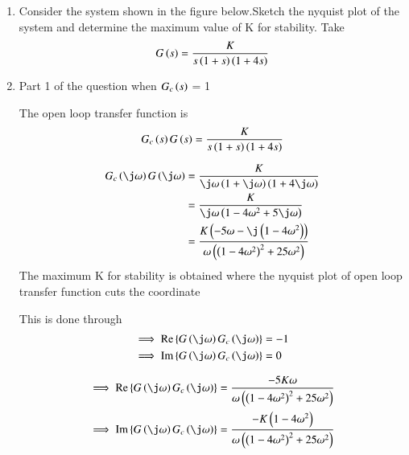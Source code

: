 \begin{enumerate}[label=\thesubsection.\arabic*.,ref=\thesubsection.\theenumi]

\item Consider the system shown in the figure below.Sketch the nyquist plot of the system and determine the maximum value of K for stability.
Take  
\begin{align}
G\brak{s} = \frac{K}{s\brak{1+s}\brak{1+4s}}
\label{ee18btech11034_Gs}
\end{align}

\begin{figure}[!ht]
	\begin{center}
		
		\resizebox{\columnwidth}{!}{}
	\end{center}
\caption{}
\end{figure}

\solution
\item Part 1 of the question when $G_{c}\left(s\right)$ = 1

The open loop transfer function is 
\begin{align}
    G_{c}\left(s\right)G\left(s\right) = \frac{K}{s\left(1+s\right)\left(1+4s\right)}
\end{align}

\begin{align}
    G_{c}\brak{\j\omega}G\brak{\j\omega} &= \frac{K}{{\j\omega}\brak{1+\j\omega}\brak{1+4\j\omega}}
    \\
    &= \frac{K}{{\j\omega}\brak{1-4\omega^2+5\j\omega}}
    \\
    &= \frac{K\brak{-5\omega-\j\brak{1-4\omega^2}}}{{\omega}\brak{\brak{1-4\omega^2}^2+25\omega^2}}
    \end{align}
The maximum K for stability is obtained where the nyquist plot of open loop transfer function cuts the coordinate 

This is done through 
\begin{align}
 \implies    \text{Re} \cbrak{G\brak{\j \omega}G_{c}\brak{\j\omega}} &= -1
 \label{ee18btech11034_eq_Re}
 \\
 \implies \text{Im} \cbrak{G\brak{\j \omega}G_{c}\brak{\j\omega}} &= 0
 \label{ee18btech11034_eq_Im}
\end{align}

\begin{align}
 \implies    \text{Re} \cbrak{G\brak{\j \omega}G_{c}\brak{\j\omega}} &= \frac{-5K\omega}{{\omega}\brak{\brak{1-4\omega^2}^2+25\omega^2}}
 \label{ee18btech11034_eq_1_Re}
 \\
 \implies \text{Im} \cbrak{G\brak{\j \omega}G_{c}\brak{\j\omega}} &= \frac{-K\brak{1-4\omega^2}}{{\omega}\brak{\brak{1-4\omega^2}^2+25\omega^2}}
 \label{ee18btech11034_eq_1_Im}
\end{align}


\end{enumerate}
